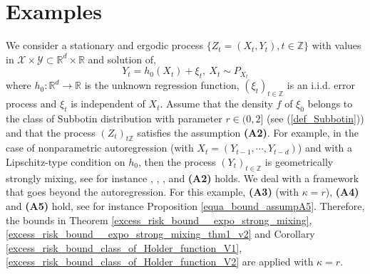 \documentclass[10pt,twoside]{article}
\numberwithin{equation}{section}
\newcommand{\R}{\ensuremath{\mathbb{R}}}
\newcommand{\Z}{\ensuremath{\mathbb{Z}}}
\begin{document}
\section{Examples}\label{example}
%
We consider a stationary and ergodic process $\{Z_t =(X_t, Y_t), t \in \Z \} $ with values in $ \mathcal{X} \times \mathcal{Y} \subset \R^d \times \R$ and solution of,
% 
\begin{equation}\label{equa_model_reg2}
Y_t = h_0(X_t) + \xi_t, ~ X_t \sim P_{X_t}
\end{equation}
%
where $h_0 : \R ^d \to \R$ is the unknown regression function, $(\xi_t)_{t \in \Z}$ is an i.i.d. error process and $\xi_t$ is independent of $X_t$.
%
Assume that the density $f$ of $\xi_0$ belongs to the class of Subbotin distribution with parameter $r \in (0,2]$ (see (\ref{def_Subbotin})) and that the process $(Z_t)_{t \Z}$ satisfies the assumption \textbf{(A2)}.
%
For example, in the case of nonparametric autoregression (with $X_t=(Y_{t-1},\cdots,Y_{t-d})$) and with a Lipschitz-type condition on $h_0$, then the process $(Y_t)_{t \in \Z}$ is geometrically strongly mixing, see for instance \cite{doukhan1994mixing}, \cite{chen2000geometric}, \cite{chen2018generalized}, and \textbf{(A2)} holds. 
%
We deal with a framework that goes beyond the autoregression.
%
For this example, \textbf{(A3)} (with $\kappa=r$), \textbf{(A4)} and \textbf{(A5)} hold, see for instance Proposition \ref{equa_bound_assumpA5}.
%
Therefore, the bounds in Theorem \ref{excess_risk_bound__expo_strong_mixing}, \ref{excess_risk_bound__expo_strong_mixing_thm1_v2} and Corollary \ref{excess_risk_bound_class_of_Holder_function_V1}, \ref{excess_risk_bound_class_of_Holder_function_V2}
are applied with $\kappa = r$.
%
\end{document}
